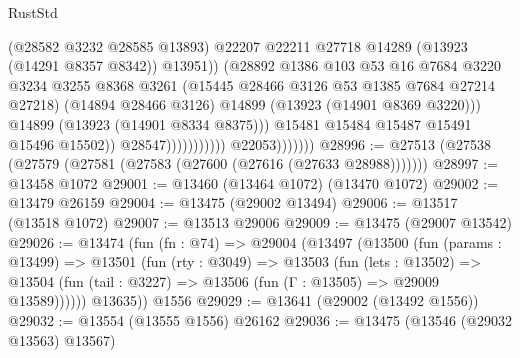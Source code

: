 \begin{lexlean}{RustStd}
\begin{coremodule}
                                                  (@28582 @3232 @28585 @13893)
                                                  @22207
                                                  @22211
                                                  @27718
                                                  @14289
                                                  (@13923 (@14291 @8357 @8342))
                                                  @13951))
                                              (@28892
                                                @1386
                                                @103
                                                @53
                                                @16
                                                @7684
                                                @3220
                                                @3234
                                                @3255
                                                @8368
                                                @3261
                                                (@15445 @28466 @3126 @53 @1385 @7684 @27214 @27218)
                                                (@14894 @28466 @3126)
                                                @14899
                                                (@13923 (@14901 @8369 @3220)))
                                              @14899
                                              (@13923 (@14901 @8334 @8375)))
                                            @15481
                                            @15484
                                            @15487
                                            @15491
                                            @15496
                                            @15502))
                                        @28547)))))))))))
                  @22053)))))))
@28996 := @27513 (@27538 (@27579 (@27581 (@27583 (@27600 (@27616 (@27633 @28988)))))))
@28997 := @13458 @1072
@29001 := @13460 (@13464 @1072) (@13470 @1072)
@29002 := @13479 @26159
@29004 := @13475 (@29002 @13494)
@29006 := @13517 (@13518 @1072)
@29007 := @13513 @29006
@29009 := @13475 (@29007 @13542)
@29026 := @13474
    (fun (fn : @74) =>
    @29004
      (@13497
        (@13500
          (fun (params : @13499) =>
          @13501
            (fun (rty : @3049) =>
            @13503
              (fun (lets : @13502) =>
              @13504 (fun (tail : @3227) => @13506 (fun (Γ : @13505) => @29009 @13589))))))
        @13635))
    @1556
@29029 := @13641 (@29002 (@13492 @1556))
@29032 := @13554 (@13555 @1556) @26162
@29036 := @13475 (@13546 (@29032 @13563) @13567)

\end{coremodule}
\end{lexlean}
